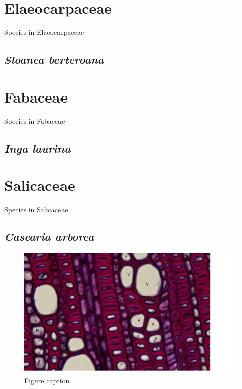 \documentclass[
]{book}
\begin{document}
\hypertarget{elaeocarpaceae}{%
\chapter{Elaeocarpaceae}\label{elaeocarpaceae}}

Species in Elaeocarpaceae

\hypertarget{sloanea-berteroana}{%
\section*{\texorpdfstring{\emph{Sloanea berteroana}}{Sloanea berteroana}}\label{sloanea-berteroana}}

\hypertarget{fabaceae}{%
\chapter{Fabaceae}\label{fabaceae}}

Species in Fabaceae

\hypertarget{inga-laurina}{%
\section*{\texorpdfstring{\emph{Inga laurina}}{Inga laurina}}\label{inga-laurina}}

\hypertarget{salicaceae}{%
\chapter{Salicaceae}\label{salicaceae}}

Species in Salicaceae

\hypertarget{casearia-arborea}{%
\section*{\texorpdfstring{\emph{Casearia arborea}}{Casearia arborea}}\label{casearia-arborea}}

\begin{figure}

{\centering \includegraphics[width=17.78in,height=0.4\textheight]{images/CASARB/2021-03-10_Image_reference_library.pptx_Page_04} 

}

\caption{Figure caption}\label{fig:unnamed-chunk-11}
\end{figure}
\end{document}
